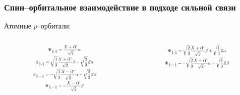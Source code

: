 \documentclass{beamer}
\begin{document}
\begin{frame}
    \frametitle{Спин--орбитальное взаимодействие в подходе сильной связи}
    Атомные $p$--орбитали:
    \begin{columns}
    \begin{column}{0.5\textwidth}
    \begin{equation}
    	\label{transform1}
        \scalebox{0.6}{$
    	\begin{gathered}
            \Psi_{\frac{3}{2},\frac{3}{2}} = \frac{X + iY}{\sqrt{2}}\alpha\\
            \Psi_{\frac{3}{2}, \frac{1}{2}} = \sqrt{\frac{1}{3}}\frac{X + iY}{\sqrt{2}}\beta -
                                             \sqrt{\frac{2}{3}} Z\alpha\\
            \Psi_{\frac{3}{2}, -\frac{1}{2}} = -\sqrt{\frac{1}{3}}\frac{X - iY}{\sqrt{2}}\alpha -
                                             \sqrt{\frac{2}{3}} Z\beta\\
            \Psi_{\frac{3}{2},-\frac{3}{2}} = -\frac{X - iY}{\sqrt{2}}\beta
    	\end{gathered}
        $}
    \end{equation}
    \end{column}
    \begin{column}{0.5\textwidth}
    \begin{equation}
    	\label{transform2}
        \scalebox{0.6}{$
    	\begin{gathered}
            \Psi_{\frac{1}{2}, \frac{1}{2}} = \sqrt{\frac{2}{3}}\frac{X + iY}{\sqrt{2}}\beta +
                                             \sqrt{\frac{1}{3}} Z\alpha\\
            \Psi_{\frac{1}{2}, -\frac{1}{2}} = -\sqrt{\frac{2}{3}}\frac{X - iY}{\sqrt{2}}\alpha-
                                             \sqrt{\frac{1}{3}} Z\beta\\
    	\end{gathered}
        $}
    \end{equation}
    \end{column}
    \end{columns}
\end{frame}
\end{document}
